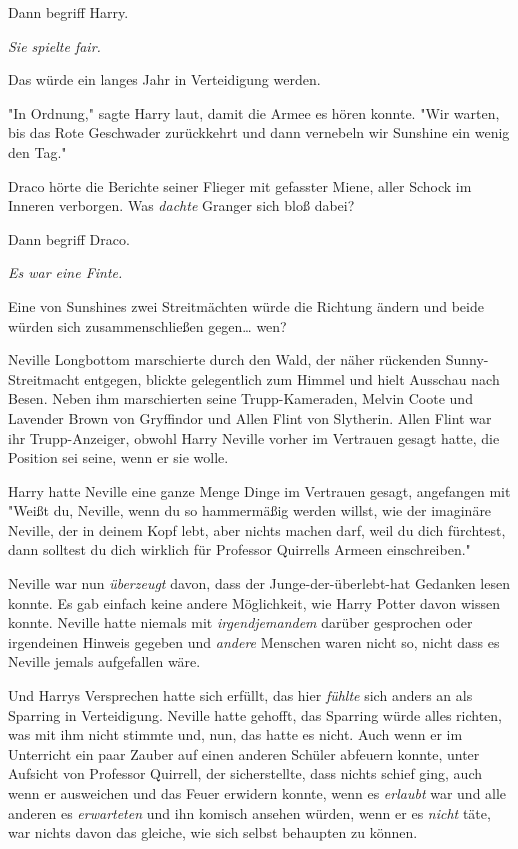 {Dann begriff Harry.

\emph{Sie spielte fair.}

Das würde ein langes Jahr in Verteidigung werden.

"In Ordnung," sagte Harry laut, damit die Armee es hören konnte. "Wir warten, bis das Rote Geschwader zurückkehrt und dann vernebeln wir Sunshine ein wenig den Tag."

\later

Draco hörte die Berichte seiner Flieger mit gefasster Miene, aller Schock im Inneren verborgen. Was \emph{dachte} Granger sich bloß dabei?

Dann begriff Draco.

\emph{Es war eine Finte.}

Eine von Sunshines zwei Streitmächten würde die Richtung ändern und beide würden sich zusammenschließen gegen… wen?

\later

Neville Longbottom marschierte durch den Wald, der näher rückenden Sunny-Streitmacht entgegen, blickte gelegentlich zum Himmel und hielt Ausschau nach Besen. Neben ihm marschierten seine Trupp-Kameraden, Melvin Coote und Lavender Brown von Gryffindor und Allen Flint von Slytherin. Allen Flint war ihr Trupp-Anzeiger, obwohl Harry Neville vorher im Vertrauen gesagt hatte, die Position sei seine, wenn er sie wolle.

Harry hatte Neville eine ganze Menge Dinge im Vertrauen gesagt, angefangen mit "Weißt du, Neville, wenn du so hammermäßig werden willst, wie der imaginäre Neville, der in deinem Kopf lebt, aber nichts machen darf, weil du dich fürchtest, dann solltest du dich wirklich für Professor Quirrells Armeen einschreiben."

Neville war nun \emph{überzeugt} davon, dass der Junge-der-überlebt-hat Gedanken lesen konnte. Es gab einfach keine andere Möglichkeit, wie Harry Potter davon wissen konnte. Neville hatte niemals mit \emph{irgendjemandem} darüber gesprochen oder irgendeinen Hinweis gegeben und \emph{andere} Menschen waren nicht so, nicht dass es Neville jemals aufgefallen wäre.

Und Harrys Versprechen hatte sich erfüllt, das hier \emph{fühlte} sich anders an als Sparring in Verteidigung. Neville hatte gehofft, das Sparring würde alles richten, was mit ihm nicht stimmte und, nun, das hatte es nicht. Auch wenn er im Unterricht ein paar Zauber auf einen anderen Schüler abfeuern konnte, unter Aufsicht von Professor Quirrell, der sicherstellte, dass nichts schief ging, auch wenn er ausweichen und das Feuer erwidern konnte, wenn es \emph{erlaubt} war und alle anderen es \emph{erwarteten} und ihn komisch ansehen würden, wenn er es \emph{nicht} täte, war nichts davon das gleiche, wie sich selbst behaupten zu können.

}

